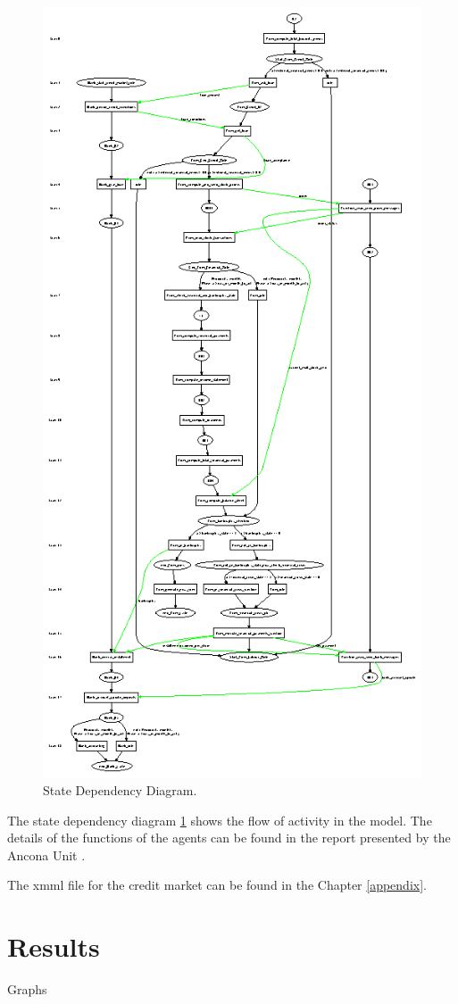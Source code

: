 \begin{figure}[!htb]
\begin{center}
 \includegraphics*[scale=2.0]{stategraph.ps}
\caption{State Dependency Diagram.} \label{fig:statecredit}
\end{center}
\end{figure}

The state dependency diagram \ref{fig:statecredit} shows the flow of
activity in the model. The details of the functions of the agents
can be found in the report presented by the Ancona Unit \cite{?}.

The xmml file for the credit market can be found in the Chapter
\ref{appendix}.

\section{Results}
Graphs
